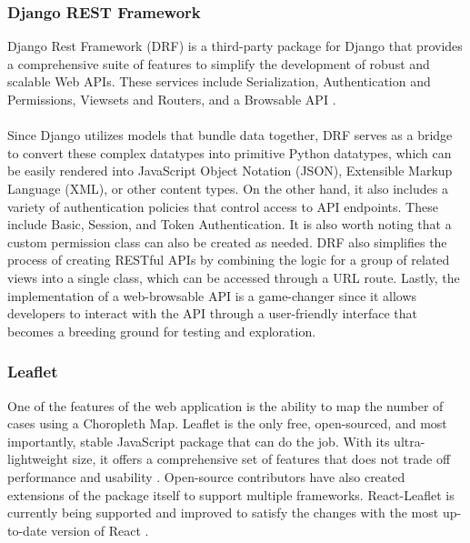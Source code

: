 \subsubsection{Django REST Framework}
Django Rest Framework (DRF) is a third-party package for Django that provides a comprehensive suite of features to simplify the development of robust and scalable Web APIs. These services include Serialization, Authentication and Permissions, Viewsets and Routers, and a Browsable API \cite{christie-no-date}. \\\\
Since Django utilizes models that bundle data together, DRF serves as a bridge to convert these complex datatypes into primitive Python datatypes, which can be easily rendered into JavaScript Object Notation (JSON), Extensible Markup Language (XML), or other content types. On the other hand, it also includes a variety of authentication policies that control access to API endpoints. These include Basic, Session, and Token Authentication. It is also worth noting that a custom permission class can also be created as needed. DRF also simplifies the process of creating RESTful APIs by combining the logic for a group of related views into a single class, which can be accessed through a URL route. Lastly, the implementation of a web-browsable API is a game-changer since it allows developers to interact with the API through a user-friendly interface that becomes a breeding ground for testing and exploration. 

\subsubsection{Leaflet}
One of the features of the web application is the ability to map the number of cases using a Choropleth Map. Leaflet is the only free, open-sourced, and most importantly, stable JavaScript package that can do the job. With its ultra-lightweight size, it offers a comprehensive set of features that does not trade off performance and usability \cite{leaflet-no-date}. Open-source contributors have also created extensions of the package itself to support multiple frameworks. React-Leaflet is currently being supported and improved to satisfy the changes with the most up-to-date version of React \cite{react-leaflet-no-date}. 

